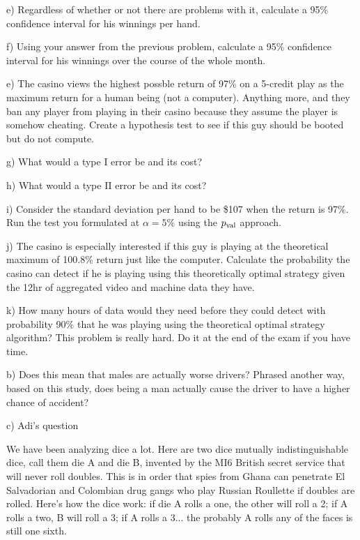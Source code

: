 \documentclass[12pt]{article}
\begin{document}
e) Regardless of whether or not there are problems with it, calculate a 95\% confidence interval for his winnings per hand.

f) Using your answer from the previous problem, calculate a 95\% confidence interval for his winnings over the course of the whole month.

e) The casino views the highest possble return of 97\% on a 5-credit play as the maximum return for a human being (not a computer). Anything more, and they ban any player from playing in their casino because they assume the player is somehow cheating. Create a hypothesis test to see if this guy should be booted but do not compute.

g) What would a type I error be and its cost?

h) What would a type II error be and its cost?

i) Consider the standard deviation per hand to be \$107 when the return is 97\%. Run the test you formulated at $\alpha = 5\%$ using the $p_{\text{val}}$ approach.

j) The casino is especially interested if this guy is playing at the theoretical maximum of 100.8\% return just like the computer. Calculate the probability the casino can detect if he is playing using this theoretically optimal strategy given the 12hr of aggregated video and machine data they have.

k) How many hours of data would they need before they could detect with probability 90\% that he was playing using the theoretical optimal strategy algorithm? This problem is really hard. Do it at the end of the exam if you have time.



b) Does this mean that males are actually worse drivers? Phrased another way, based on this study, does being a man actually cause the driver to have a higher chance of accident?

c) Adi's question




We have been analyzing dice a lot. Here are two dice mutually indistinguishable dice, call them die A and die B, invented by the MI6 British secret service that will never roll doubles. This is in order that spies from Ghana can penetrate El Salvadorian and Colombian drug gangs who play Russian Roullette if doubles are rolled. Here's how the dice work: if die A rolls a one, the other will roll a 2; if A rolls a two, B will roll a 3; if A rolls a 3... the probably A rolls any of the faces is still one sixth.
\end{document}
